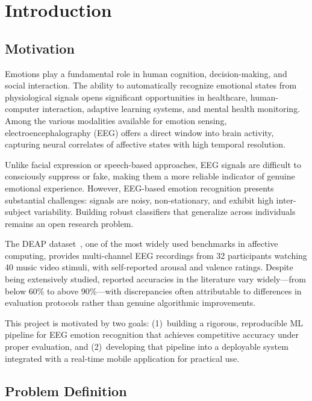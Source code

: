 \documentclass[12pt,a4paper]{report}
\begin{document}
\chapter{Introduction}
\label{ch:introduction}

\section{Motivation}
\label{sec:motivation}

Emotions play a fundamental role in human cognition, decision-making, and
social interaction. The ability to automatically recognize emotional states
from physiological signals opens significant opportunities in healthcare,
human-computer interaction, adaptive learning systems, and mental health
monitoring. Among the various modalities available for emotion sensing,
electroencephalography (EEG) offers a direct window into brain activity,
capturing neural correlates of affective states with high temporal resolution.

Unlike facial expression or speech-based approaches, EEG signals are difficult
to consciously suppress or fake, making them a more reliable indicator of
genuine emotional experience. However, EEG-based emotion recognition presents
substantial challenges: signals are noisy, non-stationary, and exhibit high
inter-subject variability. Building robust classifiers that generalize across
individuals remains an open research problem.

The DEAP dataset~\cite{koelstra2012deap}, one of the most widely used
benchmarks in affective computing, provides multi-channel EEG recordings from
32 participants watching 40 music video stimuli, with self-reported arousal
and valence ratings. Despite being extensively studied, reported accuracies
in the literature vary widely---from below 60\% to above 90\%---with
discrepancies often attributable to differences in evaluation protocols rather
than genuine algorithmic improvements.

This project is motivated by two goals: (1)~building a rigorous, reproducible
ML pipeline for EEG emotion recognition that achieves competitive accuracy
under proper evaluation, and (2)~developing that pipeline into a deployable
system integrated with a real-time mobile application for practical use.

\section{Problem Definition}
\label{sec:problem}
\end{document}
